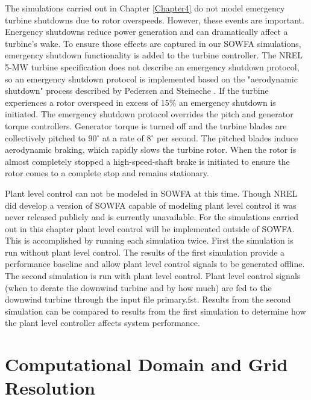 The simulations carried out in Chapter \ref{Chapter4} do not model emergency turbine shutdowns due to rotor overspeeds. However, these events are important. Energency shutdowns reduce power generation and can dramatically affect a turbine's wake. To ensure those effects are captured in our SOWFA simulations, emergency shutdown functionality is added to the turbine controller. The NREL 5-MW turbine specification does not describe an emergency shutdown protocol\cite{jonkman2009}, so an emergency shutdown protocol is implemented based on the "aerodynamic shutdown" process described by Pedersen and Steineche \cite{pedersen2012}. If the turbine experiences a rotor overspeed in excess of 15\% an emergency shutdown is initiated. The emergency shutdown protocol overrides the pitch and generator torque controllers. Generator torque is turned off and the turbine blades are collectively pitched to 90$^{\circ}$ at a rate of 8$^{\circ}$ per second. The pitched blades induce aerodynamic braking, which rapidly slows the turbine rotor. When the rotor is almost completely stopped a high-speed-shaft brake is initiated to ensure the rotor comes to a complete stop and remains stationary.

Plant level control can not be modeled in SOWFA at this time. Though NREL did develop a version of SOWFA capable of modeling plant level control \cite{fleming2013,fleming2013a} it was never released publicly and is currently unavailable. For the simulations carried out in this chapter plant level control will be implemented outside of SOWFA. This is accomplished by running each simulation twice. First the simulation is run without plant level control. The results of the first simulation provide a performance baseline and allow plant level control signals to be generated offline. The second simulation is run with plant level control. Plant level control signals (when to derate the downwind turbine and by how much) are fed to the downwind turbine through the input file primary.fst. Results from the second simulation can be compared to results from the first simulation to determine how the plant level controller affects system performance. 


\section{Computational Domain and Grid Resolution} \label{section6-3}

